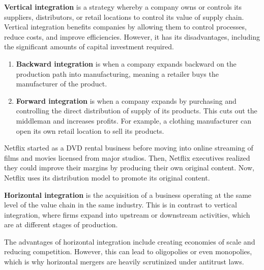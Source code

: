 \documentclass{article}
\begin{document}
    \begin{definition}
      \label{def:vertical-integration}
      \textbf{Vertical integration} is a strategy whereby a company owns or controls its suppliers, distributors, or retail locations to control its value of supply chain. Vertical integration benefits companies by allowing them to control processes, reduce costs, and improve efficiencies. However, it has its disadvantages, including the significant amounts of capital investment required. 
      \begin{enumerate}
        \item \textbf{Backward integration} is when a company expands backward on the production path into manufacturing, meaning a retailer buys the manufacturer of the product. 
        \item \textbf{Forward integration} is when a company expands by purchasing and controlling the direct distribution of supply of its products. This cuts out the middleman and increases profits. For example, a clothing manufacturer can open its own retail location to sell its products. 
      \end{enumerate}
    \end{definition}

    \begin{example}[Netflix]
      \label{ex:netflix}
      Netflix started as a DVD rental business before moving into online streaming of films and movies licensed from major studios. Then, Netflix executives realized they could improve their margins by producing their own original content. Now, Netflix uses its distribution model to promote its original content. 
    \end{example}

    \begin{definition}
      \label{def:horizontal-integration}
      \textbf{Horizontal integration} is the acquisition of a business operating at the same level of the value chain in the same industry. This is in contrast to vertical integration, where firms expand into upstream or downstream activities, which are at different stages of production. 

      The advantages of horizontal integration include creating economies of scale and reducing competition. However, this can lead to oligopolies or even monopolies, which is why horizontal mergers are heavily scrutinized under antitrust laws. 
    \end{definition}
\end{document}
